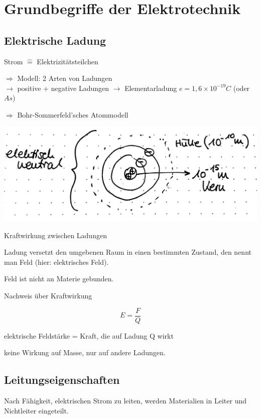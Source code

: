 \documentclass[10pt, a4paper]{article}
\newcommand{\ra}{$\rightarrow$ }
\newcommand{\Ra}{$\Rightarrow$ }
\begin{document}
\section{Grundbegriffe der Elektrotechnik}
\subsection{Elektrische Ladung}

Strom $\hat{=}$ \glqq Elektrizitätsteilchen\grqq

\Ra Modell: 2 Arten von Ladungen\\
\ra positive + negative Ladungen \ra Elementarladung $e = 1,6 \times 10^{-19}C$ (oder $As$)

\Ra Bohr-Sommerfeld'sches Atommodell

\includegraphics[width=\textwidth]{img/4}

Kraftwirkung zwischen Ladungen

Ladung versetzt den umgebenen Raum in einen bestimmten Zustand, den nennt man Feld (hier: elektrisches Feld).

Feld ist nicht an Materie gebunden.

Nachweis über Kraftwirkung

$$E = \frac{F}{Q}$$

elektrische Feldstärke = Kraft, die auf Ladung Q wirkt

keine Wirkung auf Masse, nur auf andere Ladungen.

\subsection{Leitungseigenschaften}

Nach Fähigkeit, elektrischen Strom zu leiten, werden Materialien in Leiter und Nichtleiter eingeteilt.
\end{document}
